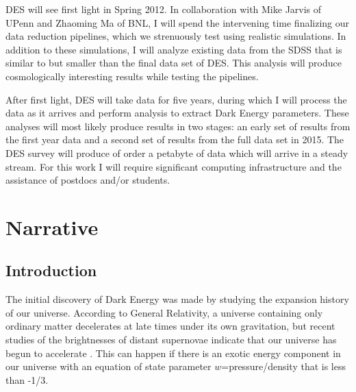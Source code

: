 \documentclass[12pt]{article}
\newcommand{\firstlight}{Spring 2012}
\begin{document}
DES will see first light in \firstlight.  In collaboration with Mike Jarvis of
UPenn and Zhaoming Ma of BNL, I will spend the intervening time finalizing our
data reduction pipelines, which we strenuously test using realistic
simulations.  In addition to these simulations, I will analyze existing data
from the SDSS that is similar to but smaller than the final data set of DES.
This analysis will produce cosmologically interesting results while testing the
pipelines.

After first light, DES will take data for five years, during which I will
process the data as it arrives and perform analysis to extract Dark Energy
parameters.  These analyses will most likely produce results in two stages: an
early set of results from the first year data and a second set of results from
the full data set in 2015.  The DES survey will produce of order a petabyte of
data which will arrive in a steady stream.  For this work I will require
significant computing infrastructure and the assistance of postdocs and/or
students.


\newpage
{}
\section*{Narrative}
\setcounter{section}{1}
\subsection{Introduction}

The initial discovery of Dark Energy was made by studying the expansion history
of our universe.  According to General Relativity, a universe containing only
ordinary matter decelerates at late times under its own gravitation, but recent
studies of the brightnesses of distant supernovae indicate that our universe
has begun to accelerate \cite{Riess98,Perlmutter99}.  This can happen if there
is an exotic energy component in our universe with an equation of state
parameter $w$=pressure/density that is less than -1/3.
\end{document}
